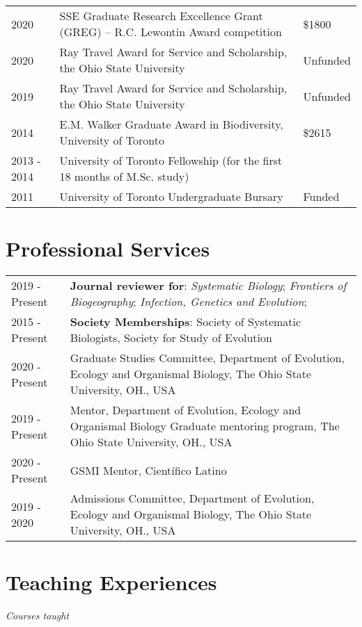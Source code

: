 \documentclass[11pt]{article}
\begin{document}
\begin{longtable}{p{}  p{} p{}}

2020 &	SSE Graduate Research Excellence Grant (GREG) – R.C. Lewontin Award competition & \$1800\\
2020 &	Ray Travel Award for Service and Scholarship, the Ohio State University & Unfunded\\
2019 &	Ray Travel Award for Service and Scholarship, the Ohio State University & Unfunded\\
2014 &	E.M. Walker Graduate Award in Biodiversity, University of Toronto & \$2615\\
2013 - 2014 & University of Toronto Fellowship (for the first 18 months of M.Sc. study)&  \\
2011 &	University of Toronto Undergraduate Bursary & Funded\\

\end{longtable}

\hspace{0pt}
\section*{Professional Services}
\begin{longtable}{p{}  p{}}

2019 - Present &	\textbf{Journal reviewer for}: \textit{Systematic Biology}; \textit{Frontiers of Biogeography}; \textit{Infection, Genetics and Evolution};\\
2015 - Present &  \textbf{Society Memberships}: Society of Systematic Biologists, Society for Study of Evolution\\
2020 - Present &  Graduate Studies Committee, Department of Evolution, Ecology and Organismal Biology, The Ohio State University, OH., USA\\
2019 - Present & Mentor, Department of Evolution, Ecology and Organismal Biology Graduate mentoring program, The Ohio State University, OH., USA\\
2020 - Present& GSMI Mentor,  Científico Latino\\
2019 - 2020 &	Admissions Committee, Department of Evolution, Ecology and Organismal Biology, The Ohio State University, OH., USA

\end{longtable}

\hspace{0pt}
\section*{Teaching Experiences}
\textit{Courses taught}
\end{document}
